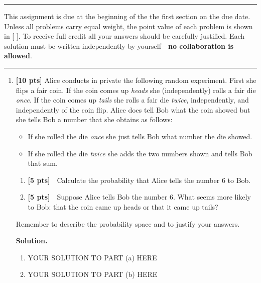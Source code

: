 \documentclass[11pt]{article}
\newcommand{\problembreak}{\bigskip\hrule\bigskip}
\newcommand{\points}[1]{\textbf{[#1 pts]}}
\begin{document}
\rule{\textwidth}{0.4pt}
This assignment is due at the beginning of the the first section on the due date.
Unless all problems carry equal weight, the point value of each
problem is shown in [ ]. To receive full
credit all your answers should be carefully justified.
Each solution must be written independently by yourself - \textbf{no collaboration is allowed}.
\problembreak


\begin{enumerate}
\item \points{10}
Alice conducts in private the following random experiment. 
First she flips a fair coin.
If the coin comes up \emph{heads} she (independently) rolls a fair die \emph{once}. 
If the coin comes up \emph{tails} she rolls a fair die \emph{twice}, independently, and independently of the coin flip. 
Alice does  tell Bob what the coin showed but she tells Bob
a number that she obtains as follows:
\begin{itemize}
    \item If she rolled the die \emph{once} she just tells Bob what number the die showed.
    \item If she rolled the die \emph{twice} she adds the two numbers shown and tells Bob that sum.
\end{itemize}
\begin{enumerate}
    \item \points{5}~~Calculate the probability that Alice tells the number 6 to Bob.
    \item \points{5}~~Suppose Alice tells Bob the number 6. What seems more likely to Bob: that the coin came up heads or that it came up tails?
\end{enumerate}
Remember to describe the probability space and to justify your answers.


\textbf{Solution.}
\begin{enumerate}
    \item YOUR SOLUTION TO PART (a) HERE
    \item YOUR SOLUTION TO PART (b) HERE
\end{enumerate}


\bigskip



\end{enumerate}
\end{document}
